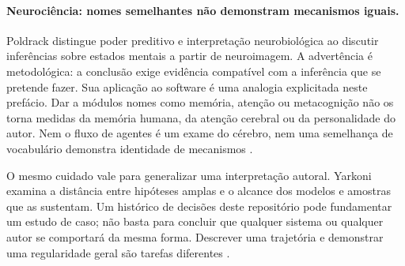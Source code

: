 \paragraph{Neurociência: nomes semelhantes não demonstram mecanismos iguais.}
Poldrack distingue poder preditivo e interpretação neurobiológica ao discutir
inferências sobre estados mentais a partir de neuroimagem. A advertência é
metodológica: a conclusão exige evidência compatível com a inferência que se
pretende fazer. Sua aplicação ao software é uma analogia explicitada neste
prefácio. Dar a módulos nomes como memória, atenção ou metacognição não os
torna medidas da memória humana, da atenção cerebral ou da personalidade do
autor. Nem o fluxo de agentes é um exame do cérebro, nem uma semelhança de
vocabulário demonstra identidade de mecanismos
.

O mesmo cuidado vale para generalizar uma interpretação autoral. Yarkoni
examina a distância entre hipóteses amplas e o alcance dos modelos e amostras
que as sustentam. Um histórico de decisões deste repositório pode fundamentar
um estudo de caso; não basta para concluir que qualquer sistema ou qualquer
autor se comportará da mesma forma. Descrever uma trajetória e demonstrar uma
regularidade geral são tarefas diferentes
.


